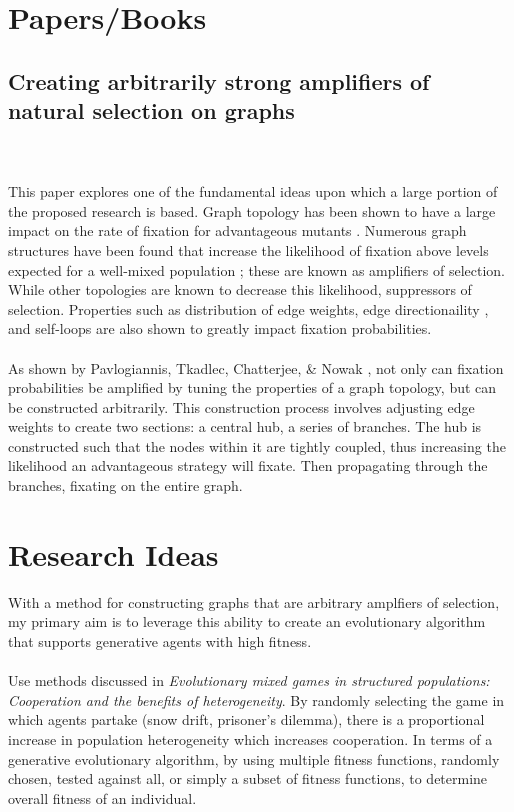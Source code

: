 \documentclass[10pt,a4paper]{article}
\begin{document}
\section{Papers/Books}
\subsection{\cite{graph amplifiers} Creating arbitrarily strong amplifiers of natural selection on graphs}
\\\\
This paper explores one of the fundamental ideas upon which a large portion of the proposed research is based.
Graph topology has been shown to have a large impact on the rate of fixation for advantageous mutants \cite{graph amplifiers, birth-death amplifiers, cooperation on graphs}.
Numerous graph structures have been found that increase the likelihood of fixation above levels expected for a well-mixed population \cite{evolution on graphs, birth-death amplifiers}; these are known as amplifiers of selection.
While other topologies are known to decrease this likelihood, suppressors of selection.
Properties such as distribution of edge weights, edge directionaility \cite{birth-death amplifiers}, and self-loops are also shown to greatly impact fixation probabilities.
\\\\
As shown by Pavlogiannis, Tkadlec, Chatterjee, \& Nowak \cite{graph amplifiers}, not only can fixation probabilities be amplified by tuning the properties of a graph topology, but can be constructed arbitrarily.
This construction process involves adjusting edge weights to create two sections: a central hub, a series of branches.
The hub is constructed such that the nodes within it are tightly coupled, thus increasing the likelihood an advantageous strategy will fixate.
Then propagating through the branches, fixating on the entire graph.


\pagebreak
\section{Research Ideas}
With a method for constructing graphs that are arbitrary amplfiers of selection, my primary aim is to leverage this ability to create an evolutionary algorithm that supports generative agents with high fitness.
\\\\
Use methods discussed in \textit{Evolutionary mixed games in structured populations: Cooperation and the benefits of heterogeneity}.
By randomly selecting the game in which agents partake (snow drift, prisoner's dilemma), there is a proportional increase in population heterogeneity which increases cooperation.
In terms of a generative evolutionary algorithm, by using multiple fitness functions, randomly chosen, tested against all, or simply a subset of fitness functions, to determine overall fitness of an individual.
\end{document}
